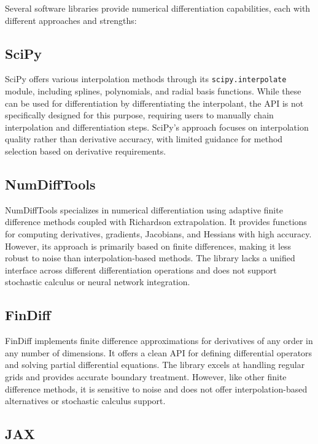 \documentclass[11pt,a4paper]{article}
\begin{document}
Several software libraries provide numerical differentiation capabilities, each with different approaches and strengths:

\subsection{SciPy}

SciPy \citep{virtanen2020scipy} offers various interpolation methods through its \texttt{scipy.interpolate} module, including splines, polynomials, and radial basis functions. While these can be used for differentiation by differentiating the interpolant, the API is not specifically designed for this purpose, requiring users to manually chain interpolation and differentiation steps. SciPy's approach focuses on interpolation quality rather than derivative accuracy, with limited guidance for method selection based on derivative requirements.

\subsection{NumDiffTools}

NumDiffTools \citep{numdifftools} specializes in numerical differentiation using adaptive finite difference methods coupled with Richardson extrapolation. It provides functions for computing derivatives, gradients, Jacobians, and Hessians with high accuracy. However, its approach is primarily based on finite differences, making it less robust to noise than interpolation-based methods. The library lacks a unified interface across different differentiation operations and does not support stochastic calculus or neural network integration.

\subsection{FinDiff}

FinDiff \citep{findiff} implements finite difference approximations for derivatives of any order in any number of dimensions. It offers a clean API for defining differential operators and solving partial differential equations. The library excels at handling regular grids and provides accurate boundary treatment. However, like other finite difference methods, it is sensitive to noise and does not offer interpolation-based alternatives or stochastic calculus support.

\subsection{JAX}
\end{document}
